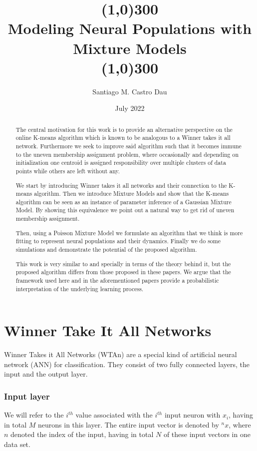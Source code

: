 \documentclass{article}
\title{\color{draculafg}\line(1,0){300}\\Modeling Neural Populations with Mixture Models\\\line(1,0){300}}
\author{\color{draculafg}Santiago M. Castro Dau}
\date{\color{draculafg}July 2022}
\begin{document}
\maketitle

\begin{abstract}
The central motivation for this work is to provide an alternative perspective on the
online K-means algorithm which is known to be analogous to a Winner takes it all
network. Furthermore we seek to improve said algorithm such that it becomes immune to the uneven
membership assignment problem, where occasionally and depending on
initialization one centroid is assigned responsibility over multiple
clusters of data points while others are left without any. 

We start by introducing Winner takes it all networks and their connection to the K-means algorithm. Then we introduce Mixture Models and show that the K-means algorithm can be seen as an instance of parameter
inference of a Gaussian Mixture Model. By showing this equivalence we point out a natural way to get rid of uneven
membership assignment. 

Then, using 
a Poisson Mixture Model we formulate an algorithm that we think is more fitting to represent neural populations and their dynamics. Finally we do some simulations and demonstrate the potential of the proposed algorithm. 

This work is very similar to \cite{Moraitis2021} and \cite{Keck2012} specially in terms of the theory
behind it, but the proposed algorithm differs from those proposed in
these papers. We argue that the framework used here and in the aforementioned papers provide a
probabilistic interpretation of the underlying learning process.
\end{abstract}

\pagebreak

\tableofcontents

\pagebreak

\section{Winner Take It All Networks}
Winner Takes it All Networks (WTAn) are a special kind of artificial neural network (ANN) for classification. They consist of two fully connected layers, the input and the output layer. 

\subsubsection*{Input layer}
We will refer to the \(i^{th}\) value associated with the \(i^{th}\) input neuron with \(x_i\), having in total \(M\) neurons in this layer. The entire input vector is denoted by \(^nx\), where \(n\) denoted the index of the input, having in total \(N\) of these input vectors in one data set. 
\end{document}
